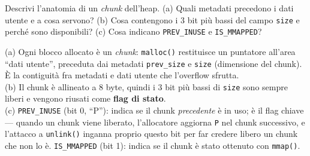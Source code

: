 \question[6]
Descrivi l'anatomia di un \emph{chunk} dell'heap. (a) Quali metadati precedono i dati utente e a cosa servono? (b) Cosa contengono i 3 bit più bassi del campo \lstinline|size| e perché sono disponibili? (c) Cosa indicano \lstinline|PREV_INUSE| e \lstinline|IS_MMAPPED|?
\begin{solution}
(a) Ogni blocco allocato è un \emph{chunk}: \lstinline|malloc()| restituisce un puntatore all'area ``dati utente'', preceduta dai metadati \lstinline|prev_size| e \lstinline|size| (dimensione del chunk). È la contiguità fra metadati e dati utente che l'overflow sfrutta.\\
(b) Il chunk è allineato a 8 byte, quindi i 3 bit più bassi di \lstinline|size| sono sempre liberi e vengono riusati come \textbf{flag di stato}.\\
(c) \lstinline|PREV_INUSE| (bit 0, ``P''): indica se il chunk \emph{precedente} è in uso; è il flag chiave --- quando un chunk viene liberato, l'allocatore aggiorna \lstinline|P| nel chunk successivo, e l'attacco a \lstinline|unlink()| inganna proprio questo bit per far credere libero un chunk che non lo è. \lstinline|IS_MMAPPED| (bit 1): indica se il chunk è stato ottenuto con \lstinline|mmap()|.
\end{solution}
